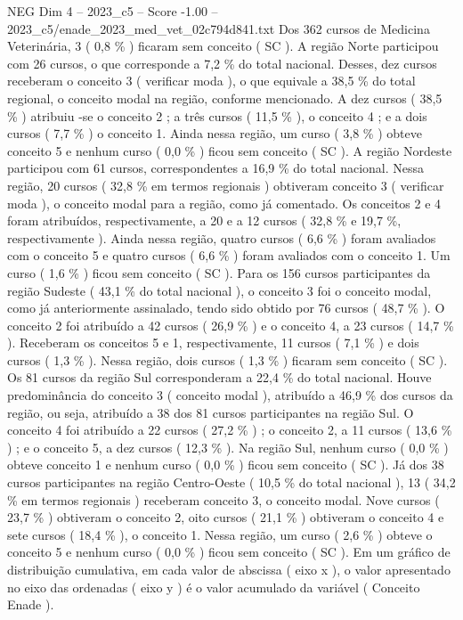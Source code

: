 \begin{textsample}{NEG Dim 4 – 2023\_c5 – Score -1.00 – 2023\_c5/enade\_2023\_med\_vet\_02c794d841.txt}
Dos 362 cursos de Medicina Veterinária, 3 ( 0,8 \% ) ficaram sem conceito ( SC ).
A região Norte participou com 26 cursos, o que corresponde a 7,2 \% do total nacional.
Desses, dez cursos receberam o conceito 3 ( verificar moda ), o que equivale a 38,5 \% do total regional, o conceito modal na região, conforme mencionado.
A dez cursos ( 38,5 \% ) atribuiu -se o conceito 2 ; a três cursos ( 11,5 \% ), o conceito 4 ; e a dois cursos ( 7,7 \% ) o conceito 1.
Ainda nessa região, um curso ( 3,8 \% ) obteve conceito 5 e nenhum curso ( 0,0 \% ) ficou sem conceito ( SC ).
A região Nordeste participou com 61 cursos, correspondentes a 16,9 \% do total nacional.
Nessa região, 20 cursos ( 32,8 \% em termos regionais ) obtiveram conceito 3 ( verificar moda ), o conceito modal para a região, como já comentado.
Os conceitos 2 e 4 foram atribuídos, respectivamente, a 20 e a 12 cursos ( 32,8 \% e 19,7 \%, respectivamente ).
Ainda nessa região, quatro cursos ( 6,6 \% ) foram avaliados com o conceito 5 e quatro cursos ( 6,6 \% ) foram avaliados com o conceito 1.
Um curso ( 1,6 \% ) ficou sem conceito ( SC ).
Para os 156 cursos participantes da região Sudeste ( 43,1 \% do total nacional ), o conceito 3 foi o conceito modal, como já anteriormente assinalado, tendo sido obtido por 76 cursos ( 48,7 \% ).
O conceito 2 foi atribuído a 42 cursos ( 26,9 \% ) e o conceito 4, a 23 cursos ( 14,7 \% ).
Receberam os conceitos 5 e 1, respectivamente, 11 cursos ( 7,1 \% ) e dois cursos ( 1,3 \% ).
Nessa região, dois cursos ( 1,3 \% ) ficaram sem conceito ( SC ).
Os 81 cursos da região Sul corresponderam a 22,4 \% do total nacional.
Houve predominância do conceito 3 ( conceito modal ), atribuído a 46,9 \% dos cursos da região, ou seja, atribuído a 38 dos 81 cursos participantes na região Sul.
O conceito 4 foi atribuído a 22 cursos ( 27,2 \% ) ; o conceito 2, a 11 cursos ( 13,6 \% ) ; e o conceito 5, a dez cursos ( 12,3 \% ).
Na região Sul, nenhum curso ( 0,0 \% ) obteve conceito 1 e nenhum curso ( 0,0 \% ) ficou sem conceito ( SC ).
Já dos 38 cursos participantes na região Centro-Oeste ( 10,5 \% do total nacional ), 13 ( 34,2 \% em termos regionais ) receberam conceito 3, o conceito modal.
Nove cursos ( 23,7 \% ) obtiveram o conceito 2, oito cursos ( 21,1 \% ) obtiveram o conceito 4 e sete cursos ( 18,4 \% ), o conceito 1.
Nessa região, um curso ( 2,6 \% ) obteve o conceito 5 e nenhum curso ( 0,0 \% ) ficou sem conceito ( SC ).
Em um gráfico de distribuição cumulativa, em cada valor de abscissa ( eixo x ), o valor apresentado no eixo das ordenadas ( eixo y ) é o valor acumulado da variável ( Conceito Enade ).

\end{textsample}

